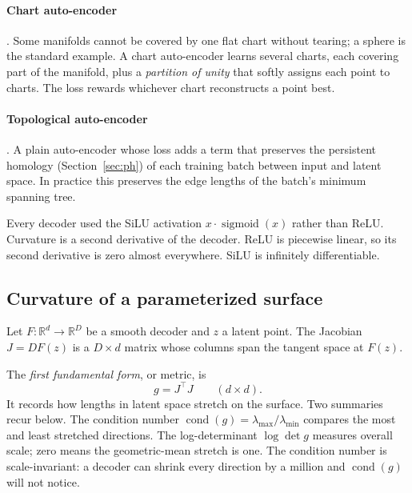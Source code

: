 \documentclass[11pt,a4paper]{article}
\begin{document}
\paragraph{Chart auto-encoder} \citep{schonsheck2019chart}. Some manifolds cannot be covered by one flat chart without tearing; a sphere is the standard example. A chart auto-encoder learns several charts, each covering part of the manifold, plus a \emph{partition of unity} that softly assigns each point to charts. The loss rewards whichever chart reconstructs a point best.

\paragraph{Topological auto-encoder} \citep{moor2020topological}. A plain auto-encoder whose loss adds a term that preserves the persistent homology (Section~\ref{sec:ph}) of each training batch between input and latent space. In practice this preserves the edge lengths of the batch's minimum spanning tree.

Every decoder used the SiLU activation $x \cdot \operatorname{sigmoid}(x)$ rather than ReLU. Curvature is a second derivative of the decoder. ReLU is piecewise linear, so its second derivative is zero almost everywhere. SiLU is infinitely differentiable.

\subsection{Curvature of a parameterized surface}
\label{sec:curvature}

Let $F : \mathbb{R}^d \to \mathbb{R}^D$ be a smooth decoder and $z$ a latent point. The Jacobian $J = DF(z)$ is a $D \times d$ matrix whose columns span the tangent space at $F(z)$.

The \emph{first fundamental form}, or metric, is
\begin{equation}
g = J^{\top} J \qquad (d \times d).
\end{equation}
It records how lengths in latent space stretch on the surface. Two summaries recur below. The condition number $\operatorname{cond}(g) = \lambda_{\max} / \lambda_{\min}$ compares the most and least stretched directions. The log-determinant $\log \det g$ measures overall scale; zero means the geometric-mean stretch is one. The condition number is scale-invariant: a decoder can shrink every direction by a million and $\operatorname{cond}(g)$ will not notice.
\end{document}

